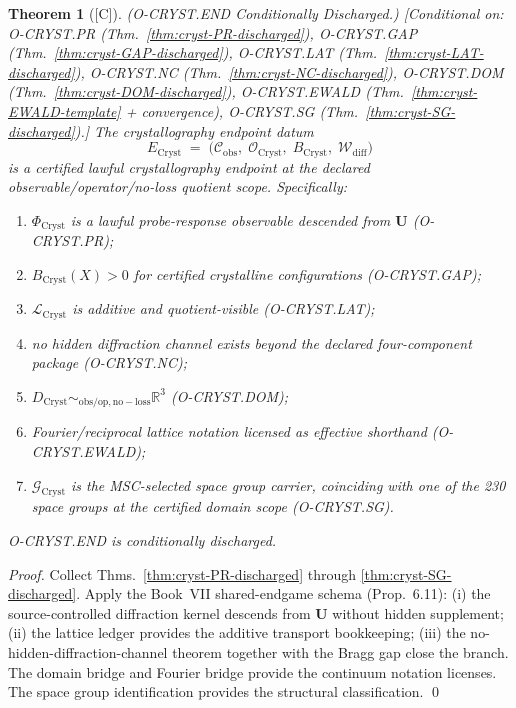 \documentclass[12pt,oneside]{amsbook}
\theoremstyle{plain}
\newtheorem{theorem}{Theorem}[section]
\theoremstyle{definition}
\theoremstyle{remark}
\newcommand{\status}[1]{\textup{[#1]}}
\begin{document}
\begin{theorem}[\status{C}]\label{thm:cryst-END-discharged}
\textup{(O-CRYST.END Conditionally Discharged.)}
\textup{[Conditional on: O-CRYST.PR (Thm.~\ref{thm:cryst-PR-discharged}),
O-CRYST.GAP (Thm.~\ref{thm:cryst-GAP-discharged}),
O-CRYST.LAT (Thm.~\ref{thm:cryst-LAT-discharged}),
O-CRYST.NC (Thm.~\ref{thm:cryst-NC-discharged}),
O-CRYST.DOM (Thm.~\ref{thm:cryst-DOM-discharged}),
O-CRYST.EWALD (Thm.~\ref{thm:cryst-EWALD-template} + convergence),
O-CRYST.SG (Thm.~\ref{thm:cryst-SG-discharged}).]}
The crystallography endpoint datum
\[
  E_{\mathrm{Cryst}} \;=\;
  \bigl(\mathcal{C}_{\mathrm{obs}},\;
        \mathcal{O}_{\mathrm{Cryst}},\;
        B_{\mathrm{Cryst}},\;
        \mathcal{W}_{\mathrm{diff}}\bigr)
\]
is a certified lawful crystallography endpoint at the declared
observable/operator/no-loss quotient scope.  Specifically:
\begin{enumerate}[label=\textup{(\arabic*)}]
  \item $\Phi_{\mathrm{Cryst}}$ is a lawful probe-response
    observable descended from $\mathbf{U}$ (O-CRYST.PR);
  \item $B_{\mathrm{Cryst}}(X) > 0$ for certified crystalline
    configurations (O-CRYST.GAP);
  \item $\mathcal{L}_{\mathrm{Cryst}}$ is additive and
    quotient-visible (O-CRYST.LAT);
  \item no hidden diffraction channel exists beyond the declared
    four-component package (O-CRYST.NC);
  \item $D_{\mathrm{Cryst}} \sim_{\mathrm{obs/op,no-loss}}
    \mathbb{R}^3$ (O-CRYST.DOM);
  \item Fourier/reciprocal lattice notation licensed as effective
    shorthand (O-CRYST.EWALD);
  \item $\mathcal{G}_{\mathrm{Cryst}}$ is the MSC-selected space
    group carrier, coinciding with one of the 230 space groups
    at the certified domain scope (O-CRYST.SG).
\end{enumerate}
O-CRYST.END is conditionally discharged.
\end{theorem}

\begin{proof}
Collect Thms.~\ref{thm:cryst-PR-discharged} through
\ref{thm:cryst-SG-discharged}.  Apply the Book~VII shared-endgame
schema (Prop.~6.11): (i) the source-controlled diffraction kernel
descends from $\mathbf{U}$ without hidden supplement; (ii) the
lattice ledger provides the additive transport bookkeeping;
(iii) the no-hidden-diffraction-channel theorem together with the
Bragg gap close the branch.  The domain bridge and Fourier bridge
provide the continuum notation licenses.  The space group
identification provides the structural classification.
\qed
\end{proof}
\end{document}

